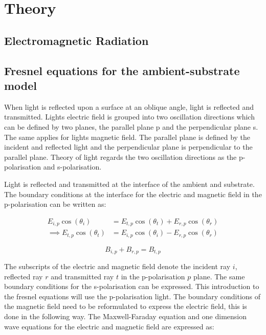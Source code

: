 \documentclass[MasterThesisMain.tex]{subfiles}
\begin{document}
\chapter{Theory}

\section{Electromagnetic Radiation}
	
\section{Fresnel equations for the ambient-substrate model}
When light is reflected upon a surface at an oblique angle, light is reflected and transmitted. Lights electric field is grouped into two oscillation directions which can be defined by two planes, the parallel plane p and the perpendicular plane s. The same applies for lights magnetic field. The parallel plane is defined by the incident and reflected light and the perpendicular plane is perpendicular to the parallel plane. Theory of light regards the two oscillation directions as the p-polarisation and s-polarisation.

Light is reflected and transmitted at the interface of the ambient and substrate. The boundary conditions at the interface for the electric and magnetic field in the p-polarisation can be written as:

\begin{align}
E_{i,p}\cos{(\theta_i)} &= E_{t,p}\cos{(\theta_t)} + E_{r,p}\cos{(\theta_r)}\\
\implies E_{t,p}\cos{(\theta_t)} &= E_{i,p}\cos{(\theta_i)} - E_{r,p}\cos{(\theta_r)}
\end{align} 

\begin{equation} 
B_{i,p} + B_{r,p} = B_{t,p}
\end{equation}

The subscripts of the electric and magnetic field denote the incident ray $i$, reflected ray $r$ and transmitted ray $t$ in the p-polarisation $p$ plane. The same boundary conditions for the s-polarisation can be expressed. This introduction to the fresnel equations will use the p-polarisation light. The boundary conditions of the magnetic field need to be reformulated to express the electric field, this is done in the following way. The Maxwell-Faraday equation and one dimension wave equations for the electric and magnetic field are expressed as:
\end{document}
